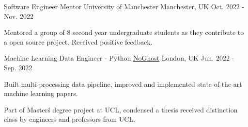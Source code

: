 



\begin{cventries}

    \cventry
        {Software Engineer Mentor} %
        {University of Manchester} %
        {Manchester, UK} %
        {Oct. 2022 - Nov. 2022} %
        {
        \begin{cvitems} %
            \item {Mentored a group of 8 second year undergraduate students as they contribute to a open source project. Received positive feedback.}
        \end{cvitems}
        }

    \cventry
        {Machine Learning Data Engineer - Python} %
        {\href{https://www.noghost.co.uk/}{NoGhost}} %
        {London, UK} %
        {Jun. 2022 - Sep. 2022} %
        {
        \begin{cvitems} %
            \item {Built multi-processing data pipeline, improved and implemented state-of-the-art machine learning papers.}
            \item {Part of Master\'s degree project at UCL, condensed a thesis received distinction class by engineers and professors from UCL.}
        \end{cvitems}
        }


\end{cventries}
